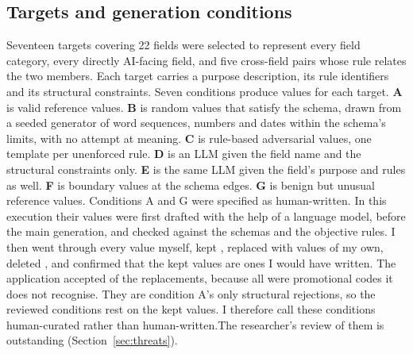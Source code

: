 \documentclass[conference]{IEEEtran}
\begin{document}
\subsection{Targets and generation conditions}
Seventeen targets covering 22 fields were selected to represent every field category, every directly
AI-facing field, and five cross-field pairs whose rule relates the two members. Each target carries a
purpose description, its rule identifiers and its structural constraints. Seven conditions produce
values for each target. \textbf{A} is valid reference values. \textbf{B} is random values that satisfy
the schema, drawn from a seeded generator of word sequences, numbers and dates within the schema's
limits, with no attempt at meaning. \textbf{C} is rule-based adversarial values, one template per
unenforced rule. \textbf{D} is an LLM given the field name and the structural constraints only.
\textbf{E} is the same LLM given the field's purpose and rules as well. \textbf{F} is boundary values
at the schema edges. \textbf{G} is benign but unusual reference values. Conditions A and G were
specified as human-written. In this execution their  values were first drafted with the
help of a language model, before the main generation, and checked against the schemas and the
objective rules. \ifreviewed I then went through every value myself, kept , replaced
 with values of my own, deleted , and confirmed that the kept values
are ones I would have written. The application accepted  of the
replacements, because all  were promotional codes it does not recognise. They are
condition A's only structural rejections, so the reviewed conditions rest on the kept values. I therefore call these
conditions human-curated rather than human-written.\else The researcher's review of them is outstanding
(Section~\ref{sec:threats}).\fi
\end{document}
